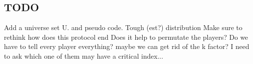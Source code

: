 \documentclass{article}
\theoremstyle{plain}
\begin{document}
\subsection{TODO}
Add a universe set U. and pseudo code. 
Tough (est?) distribution\newline
Make sure to rethink how does this protocol end \newline
Does it help to permutate the players? \newline
Do we have to tell every player everything? maybe we can get rid of the k factor? I need to ask which one of them may have a critical index... \newline
\end{document}
